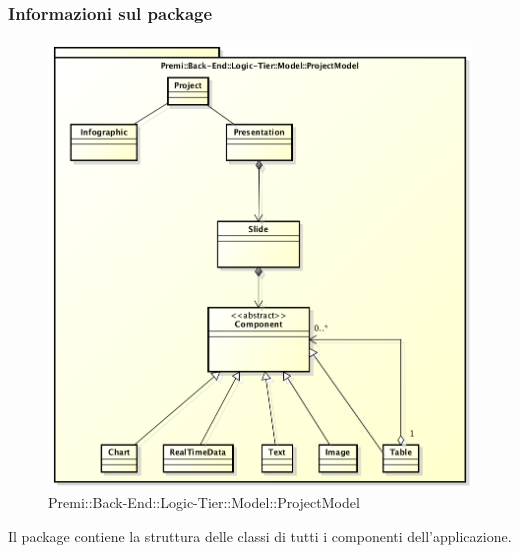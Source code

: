 	\subsubsection*{Informazioni sul package}
		\begin{figure}[h]
			\centering
			\includegraphics[width=0.9\linewidth]{img/back-end_logic-tier_model_project-model}
			\caption[Premi::Back-End::Logic-Tier::Model::ProjectModel]{Premi::Back-End::Logic-Tier::Model::ProjectModel}
		\end{figure}
		Il package contiene la struttura delle classi di tutti i componenti dell'applicazione.
	
